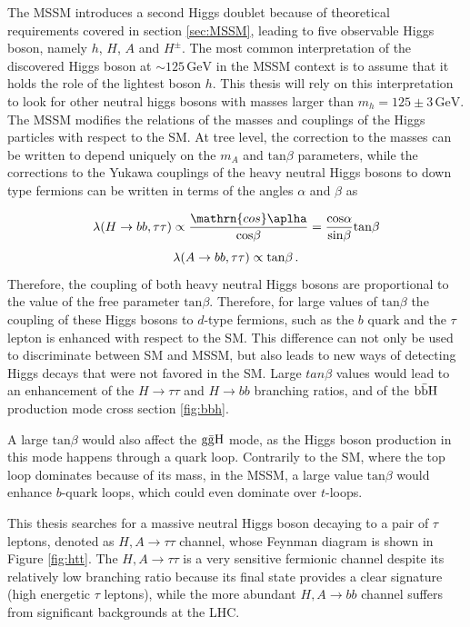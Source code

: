 The MSSM introduces a second Higgs doublet because of theoretical requirements covered in section \ref{sec:MSSM}, leading to five observable Higgs boson, namely $h$, $H$, $A$ and $H^{\pm}$. The most common interpretation of the discovered Higgs boson at $\sim 125\, \mathrm{GeV}$ in the MSSM context is to assume that it holds the role of the lightest boson $h$. This thesis will rely on this interpretation to look for other neutral higgs bosons with masses larger than $m_h = 125 \pm 3 \, \mathrm{GeV}$. The MSSM modifies the relations of the masses and couplings of the Higgs particles with respect to the SM. At tree level, the correction to the masses can be written to depend uniquely on the $m_A$ and $\mathrm{tan} \beta$ parameters, while the corrections to the Yukawa couplings of the heavy neutral Higgs bosons to down type fermions can be written in terms of the angles $\alpha$ and $\beta$ as

\begin{equation}
    \lambda(H \rightarrow bb, \tau\tau) \propto \frac{\mathrn{cos} \aplha}{\mathrm{cos} \beta} = \frac{\mathrm{cos} \alpha}{\mathrm{sin} \beta} \mathrm{tan} \beta
\end{equation}
\begin{equation}
    \lambda(A \rightarrow bb, \tau\tau) \propto \mathrm{tan} \beta \mend
\end{equation}
Therefore, the coupling of both heavy neutral Higgs bosons are proportional to the value of the free parameter $\mathrm{tan} \beta$. Therefore, for large values of $\mathrm{tan} \beta$ the coupling of these Higgs bosons to $d$-type fermions, such as the $b$ quark and the $\tau$ lepton is enhanced with respect to the SM. This difference can not only be used to discriminate between SM and MSSM, but also leads to new ways of detecting Higgs decays that were not favored in the SM. Large $tan \beta$ values would lead to an enhancement of the $H \rightarrow \tau\tau$ and $H \rightarrow bb$ branching ratios, and of the $\mathrm{b\Bar{b}H}$ production mode cross section \ref{fig:bbh}.

A large $\mathrm{tan} \beta$ would also affect the $\mathrm{g\Bar{g}H}$ mode, as the Higgs boson production in this mode happens through a quark loop. Contrarily to the SM, where the top loop dominates because of its mass, in the MSSM, a large value $\mathrm{tan} \beta$ would enhance $b$-quark loops, which could even dominate over $t$-loops.\newline


This thesis searches for a massive neutral Higgs boson decaying to a pair of $\tau$ leptons, denoted as $H, A \rightarrow \tau\tau$ channel, whose Feynman diagram is shown in Figure \ref{fig:htt}. The $H,A \rightarrow \tau\tau$ is a very sensitive fermionic channel despite its relatively low branching ratio because its final state provides a clear signature (high energetic $\tau$ leptons), while the more abundant $H,A \rightarrow bb$ channel suffers from significant backgrounds at the LHC.

